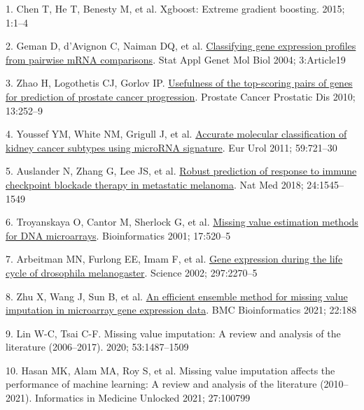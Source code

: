 \documentclass[
  12pt,
]{book}
\newlength{\cslhangindent}
\newlength{\cslentryspacingunit} %
\newenvironment{CSLReferences}[2] %
 {%
  \setlength{\parindent}{0pt}
  \ifodd #1
  \let\oldpar\par
  \def\par{\hangindent=\cslhangindent\oldpar}
  \fi
  \setlength{\parskip}{#2\cslentryspacingunit}
 }%
 {}
\begin{document}
\hypertarget{refs}{}
\begin{CSLReferences}{0}{0}
\leavevmode{}%
1. Chen T, He T, Benesty M, et al. Xgboost: Extreme gradient boosting. 2015; 1:1--4

\leavevmode{}%
2. Geman D, d'Avignon C, Naiman DQ, et al. \href{https://doi.org/10.2202/1544-6115.1071}{Classifying gene expression profiles from pairwise mRNA comparisons}. Stat Appl Genet Mol Biol 2004; 3:Article19

\leavevmode{}%
3. Zhao H, Logothetis CJ, Gorlov IP. \href{https://doi.org/10.1038/pcan.2010.9}{Usefulness of the top-scoring pairs of genes for prediction of prostate cancer progression}. Prostate Cancer Prostatic Dis 2010; 13:252--9

\leavevmode{}%
4. Youssef YM, White NM, Grigull J, et al. \href{https://doi.org/10.1016/j.eururo.2011.01.004}{Accurate molecular classification of kidney cancer subtypes using microRNA signature}. Eur Urol 2011; 59:721--30

\leavevmode{}%
5. Auslander N, Zhang G, Lee JS, et al. \href{https://doi.org/10.1038/s41591-018-0157-9}{Robust prediction of response to immune checkpoint blockade therapy in metastatic melanoma}. Nat Med 2018; 24:1545--1549

\leavevmode{}%
6. Troyanskaya O, Cantor M, Sherlock G, et al. \href{https://doi.org/10.1093/bioinformatics/17.6.520}{Missing value estimation methods for DNA microarrays}. Bioinformatics 2001; 17:520--5

\leavevmode{}%
7. Arbeitman MN, Furlong EE, Imam F, et al. \href{https://doi.org/10.1126/science.1072152}{Gene expression during the life cycle of drosophila melanogaster}. Science 2002; 297:2270--5

\leavevmode{}%
8. Zhu X, Wang J, Sun B, et al. \href{https://doi.org/10.1186/s12859-021-04109-4}{An efficient ensemble method for missing value imputation in microarray gene expression data}. BMC Bioinformatics 2021; 22:188

\leavevmode{}%
9. Lin W-C, Tsai C-F. Missing value imputation: A review and analysis of the literature (2006--2017). 2020; 53:1487--1509

\leavevmode{}%
10. Hasan MK, Alam MA, Roy S, et al. Missing value imputation affects the performance of machine learning: A review and analysis of the literature (2010--2021). Informatics in Medicine Unlocked 2021; 27:100799


\end{CSLReferences}
\end{document}
